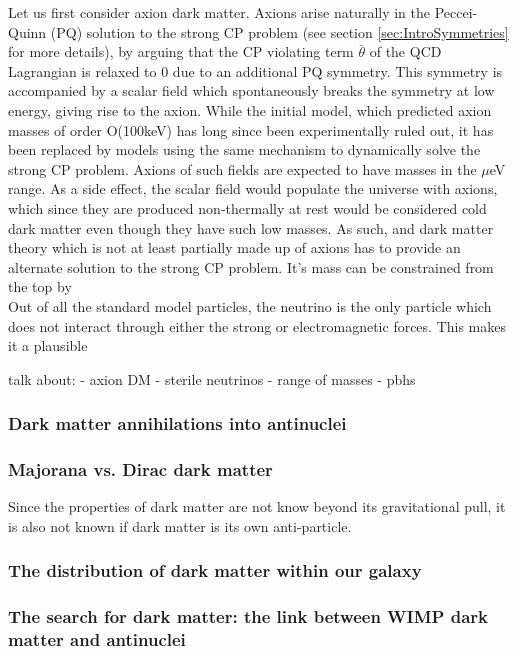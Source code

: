 Let us first consider axion dark matter. Axions arise naturally in the Peccei-Quinn (PQ) solution to the strong CP problem\cite{PQ_axion, Weinberg} (see section \ref{sec:IntroSymmetries} for more details), by arguing that the CP violating term $\bar{\theta}$ of the QCD Lagrangian is relaxed to 0 due to an additional PQ symmetry. This symmetry is accompanied by a scalar field which spontaneously breaks the symmetry at low energy, giving rise to the axion. While the initial model, which predicted axion masses of order O(100keV) has long since been experimentally ruled out, it has been replaced by models using the same mechanism to dynamically solve the strong CP problem. Axions of such fields are expected to have masses in the $\mu$eV range. As a side effect, the scalar field would populate the universe with axions, which since they are produced non-thermally at rest\cite{cookbook} would be considered cold dark matter even though they have such low masses. As such, and dark matter theory which is not at least partially made up of axions has to provide an alternate solution to the strong CP problem. It's mass can be constrained from the top by \\

Out of all the standard model particles, the neutrino is the only particle which does not interact through either the strong or electromagnetic forces. This makes it a plausible 

talk about:
- axion DM
- sterile neutrinos
- range of masses
- pbhs

\subsubsection{Dark matter annihilations into antinuclei}
\subsubsection{Majorana vs. Dirac dark matter}\label{sec:IntroMajoranaDiracDM}
Since the properties of dark matter are not know beyond its gravitational pull, it is also not known if dark matter is its own anti-particle. 
\subsubsection{The distribution of dark matter within our galaxy}
\subsubsection{The search for dark matter: the link between WIMP dark matter and antinuclei}